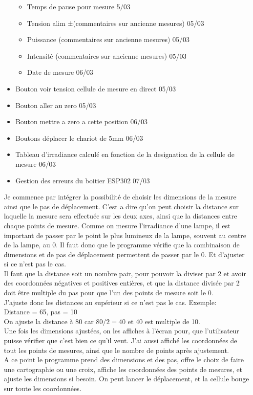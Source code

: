 \documentclass[12pt]{article}
\begin{document}
\begin{itemize}
\begin{itemize}
	\item  Temps de pause pour mesure  5/03
	\item  Tension alim ±(commentaires sur ancienne mesures)  05/03
	\item  Puissance (commentaires sur ancienne mesures)  05/03
	\item  Intensité (commentaires sur ancienne mesures)  05/03
	\item  Date de mesure  06/03
		\end{itemize}
	\item  Bouton voir tension cellule de mesure en direct  05/03
	\item  Bouton aller au zero  05/03
	\item  Bouton mettre a zero a cette position  06/03
	\item  Boutons déplacer le chariot de 5mm  06/03
	\item  Tableau d'irradiance calculé en fonction de la designation de la cellule de mesure  06/03
	\item  Gestion des erreurs du boitier ESP302 07/03
\end{itemize}


Je commence par intégrer la possibilité de choisir les dimensions de la mesure ainsi que le pas de déplacement.
C'est a dire qu'on peut choisir la distance sur laquelle la mesure sera effectuée sur les deux axes, ainsi que la distances entre chaque points de mesure.
Comme on mesure l'irradiance d'une lampe, il est important de passer par le point le plus lumineux de la lampe, souvent au centre de la lampe, au 0.
Il faut donc que le programme vérifie que la combinaison de dimensions et de pas de déplacement permettent de passer par le 0.
Et d'ajuster si ce n'est pas le cas.\\
Il faut que la distance soit un nombre pair, pour pouvoir la diviser par 2 et avoir des coordonnées négatives et positives entières, et que la distance divisée par 2 doit être multiple du pas pour que l'un des points de mesure soit le 0.\\
J'ajuste donc les distances au supérieur si ce n'est pas le cas. Exemple:\\
Distance = 65, pas = 10\\
On ajuste la distance à 80 car $80/2 = 40$ et 40 est multiple de 10.\\
Une fois les dimensions ajustées, on les affiches à l'écran pour, que l'utilisateur puisse vérifier que c'est bien ce qu'il veut.
J'ai aussi affiché les coordonnées de tout les points de mesures, ainsi que le nombre de points après ajustement.\\
A ce point le programme prend des dimensions et des pas, offre le choix de faire une cartographie ou une croix, affiche les coordonnées des points de mesures, et ajuste les dimensions si besoin.
On peut lancer le déplacement, et la cellule bouge sur toute les coordonnées.
\end{document}
